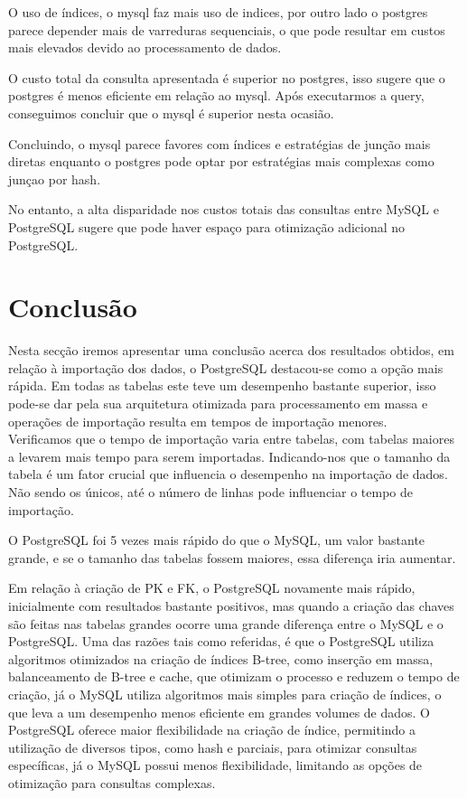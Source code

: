 \documentclass{article}
\begin{document}
O uso de índices, o mysql faz mais uso de indices, por outro lado o postgres parece depender mais de varreduras sequenciais, o que pode resultar em custos mais elevados devido ao processamento de dados.

O custo total da consulta apresentada é superior no postgres, isso sugere que o postgres é menos eficiente em relação ao mysql. Após executarmos a query, conseguimos concluir que o mysql é superior nesta ocasião.

Concluindo, o mysql parece favores com índices e estratégias de junção mais diretas enquanto o postgres pode optar por estratégias mais complexas como junçao por hash.

No entanto, a alta disparidade nos custos totais das consultas entre MySQL e PostgreSQL sugere que pode haver espaço para otimização adicional no PostgreSQL.
\clearpage
\section{Conclusão}

\texttt{}\par Nesta secção iremos apresentar uma conclusão acerca dos resultados obtidos, em relação à importação dos dados, o PostgreSQL destacou-se como a opção mais rápida. Em todas as tabelas este teve um desempenho bastante superior, isso pode-se dar pela sua arquitetura otimizada para processamento em massa e operações de importação resulta em tempos de importação menores. \\

Verificamos que o tempo de importação varia entre tabelas, com tabelas maiores a levarem mais tempo para serem importadas. Indicando-nos que o tamanho da tabela é um fator crucial que influencia o desempenho na importação de dados. Não sendo os únicos, até o número de linhas pode influenciar o tempo de importação.

O PostgreSQL foi 5 vezes mais rápido do que o MySQL, um valor bastante grande, e se o tamanho das tabelas fossem maiores, essa diferença iria aumentar.

Em relação à criação de PK e FK, o PostgreSQL novamente mais rápido, inicialmente com resultados bastante positivos, mas quando a criação das chaves são feitas nas tabelas grandes ocorre uma grande diferença entre o MySQL e o PostgreSQL. Uma das razões tais como referidas, é que o PostgreSQL utiliza algoritmos otimizados na criação de índices B-tree, como inserção em massa, balanceamento de B-tree e cache, que otimizam o processo e reduzem o tempo de criação, já o MySQL utiliza algoritmos mais simples para criação de índices, o que leva a um desempenho menos eficiente em grandes volumes de dados. O PostgreSQL oferece maior flexibilidade na criação de índice, permitindo a utilização de diversos tipos, como hash e parciais, para otimizar consultas específicas, já o MySQL possui menos flexibilidade, limitando as opções de otimização para consultas complexas.
\end{document}

